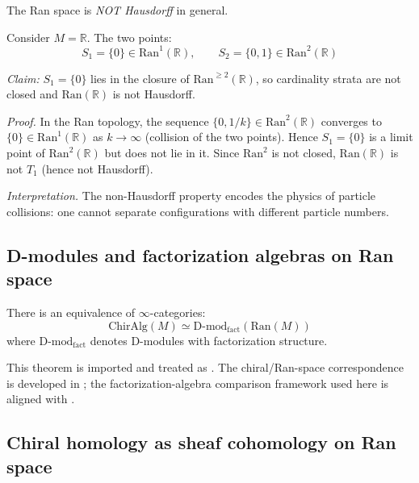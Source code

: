 \begin{example}
\label{ex:ran-non-hausdorff}
The Ran space is \emph{NOT Hausdorff} in general.

Consider $M = \mathbb{R}$. The two points:
\[S_1 = \{0\} \in \mathrm{Ran}^1(\mathbb{R}), \qquad S_2 = \{0, 1\} \in \mathrm{Ran}^2(\mathbb{R})\]

\emph{Claim:} $S_1 = \{0\}$ lies in the closure of $\mathrm{Ran}^{\geq 2}(\mathbb{R})$, so cardinality strata are not closed and $\mathrm{Ran}(\mathbb{R})$ is not Hausdorff.

\emph{Proof.} In the Ran topology, the sequence $\{0, 1/k\} \in \mathrm{Ran}^2(\mathbb{R})$ converges to $\{0\} \in \mathrm{Ran}^1(\mathbb{R})$ as $k \to \infty$ (collision of the two points).  Hence $S_1 = \{0\}$ is a limit point of $\mathrm{Ran}^2(\mathbb{R})$ but does not lie in it.  Since $\mathrm{Ran}^2$ is not closed, $\mathrm{Ran}(\mathbb{R})$ is not $T_1$ (hence not Hausdorff).

\emph{Interpretation.} The non-Hausdorff property encodes the physics of particle collisions: one cannot separate configurations with different particle numbers.
\end{example}

\subsection{D-modules and factorization algebras on Ran space}

\begin{theorem}
\label{thm:chiral-ran-Dmod}
There is an equivalence of $\infty$-categories:
\[\text{ChirAlg}(M) \simeq \text{D-mod}_{\text{fact}}(\text{Ran}(M))\]
where $\text{D-mod}_{\text{fact}}$ denotes D-modules with factorization structure.
\end{theorem}

\begin{remark}
This theorem is imported and treated as \ClaimStatusProvedElsewhere. The
chiral/Ran-space correspondence is developed in \cite[Chapter~3]{BD04}; the
factorization-algebra comparison framework used here is aligned with
\cite{FG12,CG17}.
\end{remark}

\subsection{Chiral homology as sheaf cohomology on Ran space}

